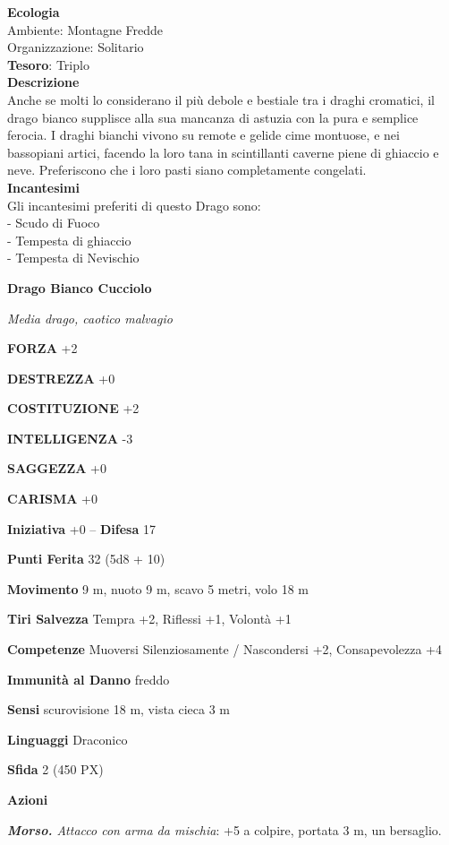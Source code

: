 \begin{multicols}{2}
	\textbf{Ecologia}\\
	Ambiente: Montagne Fredde\\
	Organizzazione: Solitario\\
	\textbf{Tesoro}: Triplo\\
	\textbf{Descrizione}\\
	Anche se molti lo considerano il più debole e bestiale tra i draghi cromatici, il drago bianco supplisce alla sua mancanza di astuzia con la pura e semplice ferocia. I draghi bianchi vivono su remote e gelide cime montuose, e nei bassopiani artici, facendo la loro tana in scintillanti caverne piene di ghiaccio e neve. Preferiscono che i loro pasti siano completamente congelati.\\
	\textbf{Incantesimi}\\
	Gli incantesimi preferiti di questo Drago sono:\\
	- Scudo di Fuoco\\
	- Tempesta di ghiaccio\\
	- Tempesta di Nevischio


	\medskip{}\textbf{Drago Bianco Cucciolo}

	\textit{Media drago, caotico malvagio}

	\textbf{FORZA} +2

	\textbf{DESTREZZA} +0

	\textbf{COSTITUZIONE} +2

	\textbf{INTELLIGENZA} -3

	\textbf{SAGGEZZA} +0

	\textbf{CARISMA} +0

	\textbf{Iniziativa} +0 -- \textbf{Difesa} 17

	\textbf{Punti Ferita} 32 (5d8 + 10)

	\textbf{Movimento} 9 m, nuoto 9 m, scavo 5 metri, volo 18 m

	\textbf{Tiri Salvezza} Tempra +2, Riflessi +1, Volontà +1

	\textbf{Competenze} Muoversi Silenziosamente / Nascondersi +2, Consapevolezza +4

	\textbf{Immunità al Danno} freddo

	\textbf{Sensi} scurovisione 18 m, vista cieca 3 m

	\textbf{Linguaggi} Draconico

	\textbf{Sfida} 2 (450 PX)

	\textbf{Azioni}

	\textit{\textbf{Morso.} Attacco con arma da mischia}: +5 a colpire, portata 3 m, un bersaglio.


\end{multicols}
